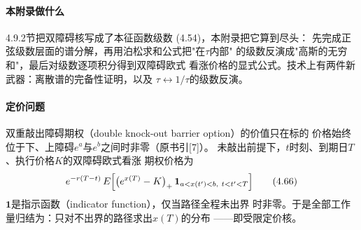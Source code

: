\paragraph{本附录做什么}
4.9.2节把双障碍核写成了本征函数级数 (4.54)，本附录把它算到尽头：
先完成正弦级数层面的谱分解，再用泊松求和公式把"在$\tau$内部"
的级数反演成"高斯的无穷和"，最后对级数逐项积分得到双障碍欧式
看涨价格的显式公式。技术上有两件新武器：离散谱的完备性证明，以及
$\tau\leftrightarrow1/\tau$的级数反演。

\paragraph{定价问题}
双重敲出障碍期权（double knock-out barrier option）的价值只在标的
价格始终位于下、上障碍$e^{a}$与$e^{b}$之间时非零（原书引[7]）。
未敲出前提下，$t$时刻、到期日$T$、执行价格$K$的双障碍欧式看涨
期权价格为
\begin{equation*}
e^{-r(T-t)}\,E\Bigl[\bigl(e^{x(T)}-K\bigr)_{+}\,
\mathbf{1}_{a<x(t')<b,\ t<t'<T}\Bigr]
\tag{4.66}
\end{equation*}
$\mathbf{1}$是指示函数（indicator function），仅当路径全程未出界
时非零。于是全部工作量归结为：只对不出界的路径求出$x(T)$的分布
——即受限定价核。

